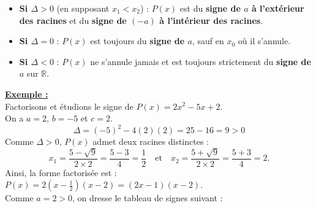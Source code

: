 \documentclass[12pt,a4paper]{article}
\newcounter{exemple}
\newcommand{\exemple}{%
  \refstepcounter{exemple}%
  \textbf{\textcolor{green!60!black}{Exemple \theexemple :}} \ignorespaces
}
\begin{document}
\begin{itemize}[label=]
    \item \textbf{Si $\Delta > 0$} (en supposant $x_1 < x_2$) : $P(x)$ est du \textbf{signe de $a$ à l'extérieur des racines} et du \textbf{signe de $(-a)$ à l'intérieur des racines}.
    \begin{center}
    \end{center}

    \item \textbf{Si $\Delta = 0$} : $P(x)$ est toujours du \textbf{signe de $a$}, sauf en $x_0$ où il s'annule.
    \begin{center}
    \end{center}

    \item \textbf{Si $\Delta < 0$} : $P(x)$ ne s'annule jamais et est toujours strictement du \textbf{signe de $a$} sur $\mathbb{R}$.
    \begin{center}
    \end{center}
\end{itemize}

\medskip
\underline{\exemple} \\
Factorisons et étudions le signe de $P(x) = 2x^2 - 5x + 2$. \\
On a $a = 2$, $b = -5$ et $c = 2$.
$$\Delta = (-5)^2 - 4(2)(2) = 25 - 16 = 9 > 0$$
Comme $\Delta > 0$, $P(x)$ admet deux racines distinctes :
$$x_1 = \frac{5 - \sqrt{9}}{2 \times 2} = \frac{5 - 3}{4} = \frac{1}{2} \quad \text{et} \quad x_2 = \frac{5 + \sqrt{9}}{2 \times 2} = \frac{5 + 3}{4} = 2.$$
Ainsi, la forme factorisée est : $P(x) = 2\left(x - \frac{1}{2}\right)(x - 2) = (2x - 1)(x - 2)$. \\
Comme $a = 2 > 0$, on dresse le tableau de signes suivant :
\begin{center}
\end{center}
\end{document}
